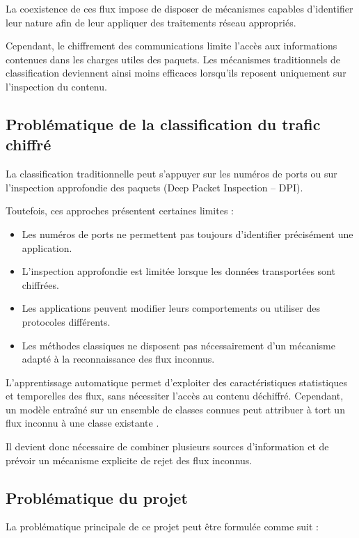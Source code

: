 La coexistence de ces flux impose de disposer de mécanismes capables
d'identifier leur nature afin de leur appliquer des traitements réseau
appropriés.

Cependant, le chiffrement des communications limite l'accès aux
informations contenues dans les charges utiles des paquets. Les
mécanismes traditionnels de classification deviennent ainsi moins
efficaces lorsqu'ils reposent uniquement sur l'inspection du contenu.

\subsection{Problématique de la classification du trafic chiffré}

La classification traditionnelle peut s'appuyer sur les numéros de
ports ou sur l'inspection approfondie des paquets (Deep Packet
Inspection -- DPI).

Toutefois, ces approches présentent certaines limites :

\begin{itemize}
    \item Les numéros de ports ne permettent pas toujours d'identifier
    précisément une application.
    \item L'inspection approfondie est limitée lorsque les données
    transportées sont chiffrées.
    \item Les applications peuvent modifier leurs comportements ou
    utiliser des protocoles différents.
    \item Les méthodes classiques ne disposent pas nécessairement
    d'un mécanisme adapté à la reconnaissance des flux inconnus.
\end{itemize}

L'apprentissage automatique permet d'exploiter des caractéristiques
statistiques et temporelles des flux, sans nécessiter l'accès au contenu
déchiffré. Cependant, un modèle entraîné sur un ensemble de classes
connues peut attribuer à tort un flux inconnu à une classe existante \cite{drapergil2016,rezei2019}.

Il devient donc nécessaire de combiner plusieurs sources d'information
et de prévoir un mécanisme explicite de rejet des flux inconnus.

\subsection{Problématique du projet}

La problématique principale de ce projet peut être formulée comme suit :

